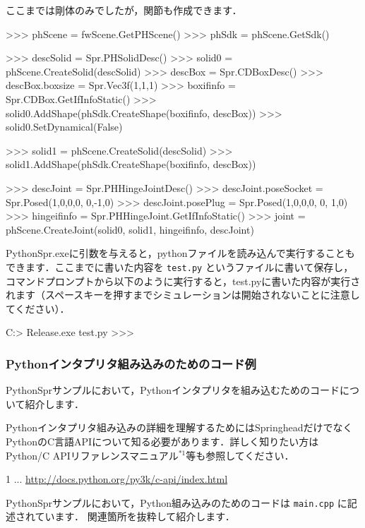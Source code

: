 \KLUDGE ここまでは剛体のみでしたが，関節も作成できます．
\begin{sourcecode}
>>> phScene = fwScene.GetPHScene()
>>> phSdk   = phScene.GetSdk()

>>> descSolid = Spr.PHSolidDesc()
>>> solid0 = phScene.CreateSolid(descSolid)
>>> descBox = Spr.CDBoxDesc()
>>> descBox.boxsize = Spr.Vec3f(1,1,1)
>>> boxifinfo = Spr.CDBox.GetIfInfoStatic()
>>> solid0.AddShape(phSdk.CreateShape(boxifinfo, descBox))
>>> solid0.SetDynamical(False)

>>> solid1 = phScene.CreateSolid(descSolid)
>>> solid1.AddShape(phSdk.CreateShape(boxifinfo, descBox))

>>> descJoint = Spr.PHHingeJointDesc()
>>> descJoint.poseSocket = Spr.Posed(1,0,0,0, 0,-1,0)
>>> descJoint.posePlug   = Spr.Posed(1,0,0,0, 0, 1,0)
>>> hingeifinfo = Spr.PHHingeJoint.GetIfInfoStatic()
>>> joint = phScene.CreateJoint(solid0, solid1, hingeifinfo, descJoint)
\end{sourcecode}


PythonSpr.exe\KLUDGE に引数を与えると，python\KLUDGE ファイルを読み込んで実行することもできます．ここまでに書いた内容を \texttt{test.py} \KLUDGE というファイルに書いて保存し，コマンドプロンプトから以下のように実行すると，test.py\KLUDGE に書いた内容が実行されます（スペースキーを押すまでシミュレーションは開始されないことに注意してください）．
\begin{sourcecode}
C:\src\Samples\EmbPython\PythonSpr> Release\PythonSpr.exe test.py
>>>
\end{sourcecode}


\subsubsection*{Python\KLUDGE インタプリタ組み込みのためのコード例}

PythonSpr\KLUDGE サンプルにおいて，Python\KLUDGE インタプリタを組み込むためのコードについて紹介します．

\begin{tips}
Python\KLUDGE インタプリタ組み込みの詳細を理解するためにはSpringhead\KLUDGE だけでなくPython\KLUDGE のC\KLUDGE 言語API\KLUDGE について知る必要があります．詳しく知りたい方はPython/C API\KLUDGE リファレンスマニュアル$^{*1}$\KLUDGE 等も参照してください．

{\footnotesize *1 ... \url{http://docs.python.org/py3k/c-api/index.html}}
\end{tips}

PythonSpr\KLUDGE サンプルにおいて，Python\KLUDGE 組み込みのためのコードは \texttt{main.cpp} \KLUDGE に記述されています．
\KLUDGE 関連箇所を抜粋して紹介します．

